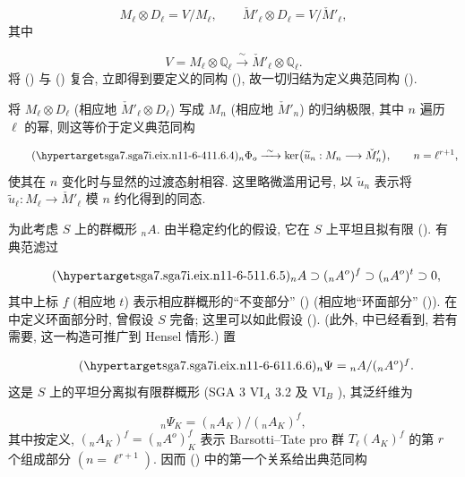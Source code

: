 \begin{equation*}
M_\ell\otimes D_\ell=V/M_\ell,\qquad
\check M'_\ell\otimes D_\ell=V/\check M'_\ell,
\end{equation*}
其中

\begin{equation*}
V=M_\ell\otimes\mathbb Q_\ell
 \xrightarrow{\ \sim\ }\check M'_\ell\otimes\mathbb Q_\ell.
\end{equation*}
将 () 与 () 复合, 立即得到要定义的同构 (), 故一切归结为定义典范同构 ().

将 $M_\ell\otimes D_\ell$ (相应地 $\check M'_\ell\otimes D_\ell$) 写成 $M_n$ (相应地 $\check M'_n$) 的归纳极限, 其中 $n$ 遍历 $\ell$ 的幂, 则这等价于定义典范同构

\begin{equation}\tag{\SGARefTarget{sga7.sga7i.eix.n11-6-4}{11.6.4}}
{}_n\Phi_o\xrightarrow{\ \sim\ }
 \ker\bigl(\widetilde u_n:M_n\longrightarrow\check M'_n\bigr),
 \qquad n=\ell^{r+1},
\end{equation}
使其在 $n$ 变化时与显然的过渡态射相容. 这里略微滥用记号, 以 $\widetilde u_n$ 表示将 $\widetilde u_\ell:M_\ell\to\check M'_\ell$ 模 $n$ 约化得到的同态.

为此考虑 $S$ 上的群概形 ${}_nA$. 由半稳定约化的假设, 它在 $S$ 上平坦且拟有限 (). 有典范滤过

\begin{equation}\tag{\SGARefTarget{sga7.sga7i.eix.n11-6-5}{11.6.5}}
{}_nA\supset({}_nA^o)^f\supset({}_nA^o)^t\supset0,
\end{equation}
其中上标 $f$ (相应地 $t$) 表示相应群概形的“不变部分” () (相应地“环面部分” ()). 在  中定义环面部分时, 曾假设 $S$ 完备; 这里可以如此假设 (). (此外,  中已经看到, 若有需要, 这一构造可推广到 Hensel 情形.) 置

\begin{equation}\tag{\SGARefTarget{sga7.sga7i.eix.n11-6-6}{11.6.6}}
{}_n\Psi={}_nA/({}_nA^o)^f.
\end{equation}
这是 $S$ 上的平坦分离拟有限群概形 (SGA 3 $\mathrm{VI}_A$ 3.2 及 $\mathrm{VI}_B$ ), 其泛纤维为

\begin{equation*}
{}_n\Psi_K=({}_nA_K)/({}_nA_K)^f,
\end{equation*}
其中按定义, $({}_nA_K)^f=({}_nA^o)^f_K$ 表示 Barsotti--Tate pro 群 $T_\ell(A_K)^f$ 的第 $r$ 个组成部分 $(n=\ell^{r+1})$. 因而 () 中的第一个关系给出典范同构

